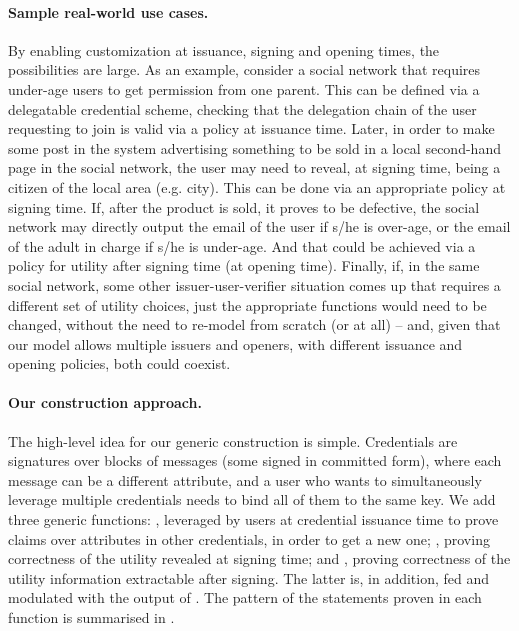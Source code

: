 \paragraph{Sample real-world use cases.} %
By enabling customization at issuance, signing and opening times, the
possibilities are large. As an example, consider a social network that requires
under-age users to get permission from one parent. This can be defined via a
delegatable credential scheme, checking that the delegation chain of the user
requesting to join is valid via a policy at issuance time. Later, in order to
make some post in the system advertising something to be sold in a local
second-hand page in the social network, the user may need to reveal, at signing
time, being a citizen of the local area (e.g. city). This can be done via an
appropriate policy at signing time. If, after the product is sold, it proves
to be defective, the social network may directly output the email of the user
if s/he is over-age, or the email of the adult in charge if s/he is under-age.
And that could be achieved via a policy for utility after signing time (at
opening time). Finally, if, in the same social network, some other
issuer-user-verifier situation comes up that requires a different set of utility
choices, just the appropriate functions would need to be changed, without the
need to re-model from scratch (or at all) -- and, given that our model allows
multiple issuers and openers, with different issuance and opening policies,
both could coexist.

\paragraph{Our construction approach.} %
The high-level idea for our generic construction \CUASGen is simple. Credentials
are signatures over blocks of messages (some signed in committed form), where
each message can be a different attribute, and a user who wants to
simultaneously leverage multiple credentials needs to bind all of them to the
same key. We add three generic functions: \fissue, leveraged by users at
credential issuance time to prove claims over attributes in other credentials,
in order to get a new one; \feval, proving correctness of the utility revealed
at signing time; and \finsp, proving correctness of the utility information
extractable after signing. The latter is, in addition, fed and modulated with
the output of \feval. The pattern of the statements proven in each function is
summarised in .

